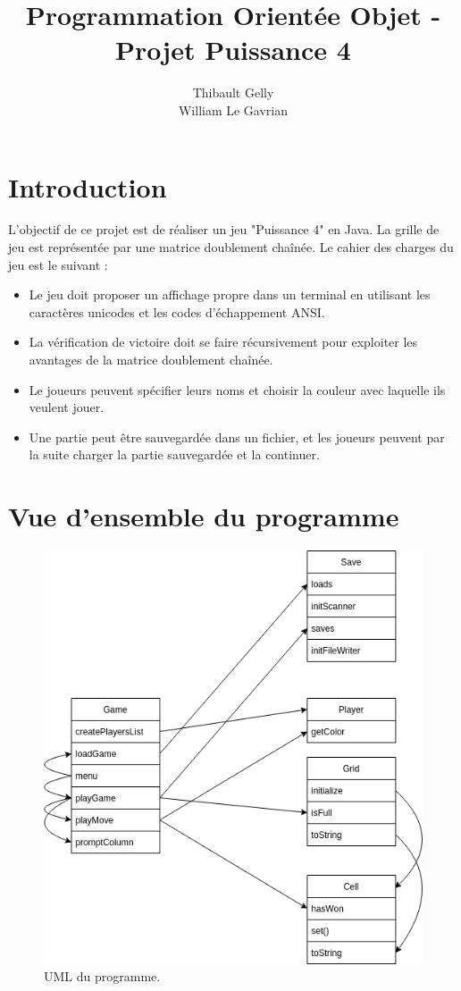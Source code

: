 \documentclass{article}
\author{Thibault Gelly\\
        William Le Gavrian}
\title{Programmation Orientée Objet - Projet Puissance 4}
\begin{document}
\date{}
\maketitle
\tableofcontents

\section{Introduction}

L'objectif de ce projet est de réaliser un jeu "Puissance 4" en Java.
La grille de jeu est représentée par une matrice doublement chaînée.
Le cahier des charges du jeu est le suivant :

\begin{itemize}
  \item Le jeu doit proposer un affichage propre dans un terminal en utilisant les caractères unicodes et les codes
  d'échappement ANSI.
  \item La vérification de victoire doit se faire récursivement pour exploiter les avantages de la matrice doublement chaînée.
  \item Le joueurs peuvent spécifier leurs noms et choisir la couleur avec laquelle ils veulent jouer.
  \item Une partie peut être sauvegardée dans un fichier, et les joueurs peuvent par la suite charger la partie sauvegardée et 
  la continuer.
\end{itemize}

\section{Vue d'ensemble du programme}

\begin{figure}
  \includegraphics[width=12cm]{diagram.png}
  \centering
  \caption{UML du programme.}
\end{figure}
\end{document}
